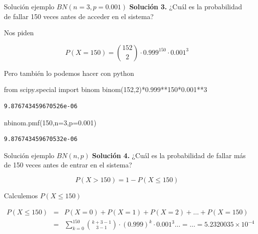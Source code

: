 \documentclass[
  ignorenonframetext,
  aspectratio=169]{beamer}
\newenvironment{Shaded}{\begin{snugshade}}{\end{snugshade}}
\newcommand{\DecValTok}[1]{\textcolor[rgb]{0.68,0.00,0.00}{#1}}
\newcommand{\FloatTok}[1]{\textcolor[rgb]{0.68,0.00,0.00}{#1}}
\newcommand{\ImportTok}[1]{\textcolor[rgb]{0.00,0.46,0.62}{#1}}
\newcommand{\NormalTok}[1]{\textcolor[rgb]{0.00,0.23,0.31}{#1}}
\newcommand{\OperatorTok}[1]{\textcolor[rgb]{0.37,0.37,0.37}{#1}}
\begin{document}
\begin{frame}[fragile]{Solución ejemplo \(BN(n=3,p=0.001)\)}
\protect\hypertarget{soluciuxf3n-ejemplo-bnn3p0.001-1}{}
\textbf{Solución 3.} ¿Cuál es la probabilidad de fallar 150 veces antes
de acceder en el sistema?

Nos piden

\[
P(X=150)= {152\choose 2} \cdot 0.999^{150}\cdot 0.001^3
\]

Pero también lo podemos hacer con python

\begin{Shaded}
\begin{Highlighting}[]
\ImportTok{from}\NormalTok{  scipy.special }\ImportTok{import}\NormalTok{ binom}
\NormalTok{binom(}\DecValTok{152}\NormalTok{,}\DecValTok{2}\NormalTok{)}\OperatorTok{*}\FloatTok{0.999}\OperatorTok{**}\DecValTok{150}\OperatorTok{*}\FloatTok{0.001}\OperatorTok{**}\DecValTok{3}
\end{Highlighting}
\end{Shaded}

\begin{verbatim}
9.876743459670526e-06
\end{verbatim}

\begin{Shaded}
\begin{Highlighting}[]
\NormalTok{nbinom.pmf(}\DecValTok{150}\NormalTok{,n}\OperatorTok{=}\DecValTok{3}\NormalTok{,p}\OperatorTok{=}\FloatTok{0.001}\NormalTok{)}
\end{Highlighting}
\end{Shaded}

\begin{verbatim}
9.876743459670532e-06
\end{verbatim}
\end{frame}

\begin{frame}{Solución ejemplo \(BN(n,p)\)}
\protect\hypertarget{soluciuxf3n-ejemplo-bnnp}{}
\textbf{Solución 4.} ¿Cuál es la probabilidad de fallar más de 150 veces
antes de entrar en el sistema?

\[P(X>150)=1-P(X\leq 150)\]

Calculemos \(P(X\leq 150)\)

\begin{eqnarray*}
P(X\leq 150) &=& P(X=0)+P(X=1)+P(X=2)+\ldots+P(X=150)\\
&=& \sum_{k=0}^{150} {k+3-1\choose 3-1} \cdot (0.999)^{k}\cdot 0.001^3\ldots = \ldots =\ensuremath{5.2320035\times 10^{-4}}
\end{eqnarray*}
\end{frame}
\end{document}

